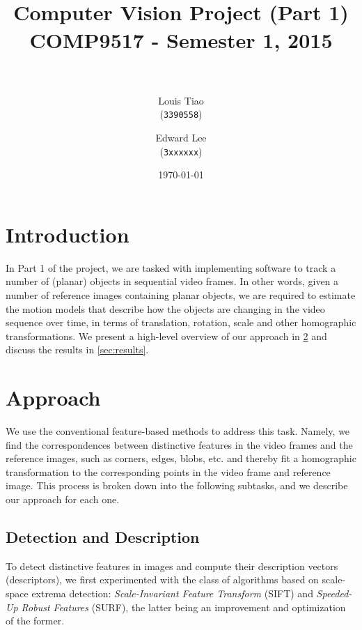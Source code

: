 \documentclass[11pt]{article} %
\title{	
\normalfont \normalsize 
\horrule{0.5pt} \\[0.4cm] %
\Large Computer Vision Project (Part 1) \\ [0.1cm] %
\large COMP9517 - Semester 1, 2015 \\ [0.2cm]
\horrule{2pt} \\[0.5cm] %
}
\author{
	Louis Tiao \\
	(\texttt{3390558})
	\and
	Edward Lee\\
	(\texttt{3xxxxxx})
} %
\date{\normalsize\today} %
\theoremstyle{plain}
\theoremstyle{definition}
\theoremstyle{remark}
\numberwithin{equation}{section} %
\numberwithin{figure}{section} %
\numberwithin{table}{section} %
\begin{document}
\maketitle %


\section{Introduction}

In Part 1 of the project, we are tasked with implementing software to track a number 
of (planar) objects in sequential video frames. In other words, given a number of 
reference images containing planar objects, we are required to estimate the motion 
models that describe how the objects are changing in the video sequence over time, 
in terms of translation, rotation, scale and other homographic transformations. We 
present a high-level overview of our approach in \cref{sec:approach} and discuss the 
results in \cref{sec:results}.

\section{Approach} \label{sec:approach}

We use the conventional feature-based methods to address this task. Namely, we find
the correspondences between distinctive features in the video frames and the reference 
images, such as corners, edges, blobs, etc. and thereby fit a homographic transformation 
to the corresponding points in the video frame and reference image. This process is
broken down into the following subtasks, and we describe our approach for each one.

\subsection{Detection and Description}


To detect distinctive features in images and compute their description vectors 
(descriptors), we first experimented with the class of algorithms based on scale-space 
extrema detection: \emph{Scale-Invariant Feature Transform} \citep{Lowe2004} (SIFT) and 
\emph{Speeded-Up Robust Features} \citep{Bay2008} (SURF), the latter being an improvement 
and optimization 
of the former. 
\end{document}
